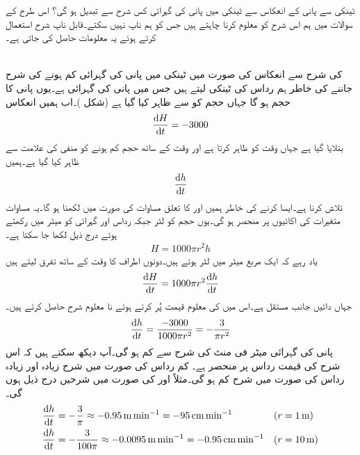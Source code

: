 ٹینکی سے  پانی کے انعکاس سے ٹینکی میں پانی کی گہرائی کس شرح سے تبدیل ہو گی؟ اس طرح کے سوالات میں ہم اس  شرح کو معلوم کرنا چاہتے  ہیں جس کو ہم ناپ نہیں سکتے۔قابل ناپ شرح استعمال کرتے ہوئے یہ معلومات حاصل کی جاتی ہے۔

\\
 کی شرح سے انعکاس کی صورت میں ٹینکی میں پانی کی گہرائی کم ہونے کی شرح جاننے کی خاطر ہم رداس  کی ٹینکی لیتے ہیں جس میں پانی کی گہرائی  ہے۔یوں پانی کا حجم  ہو گا جہاں حجم کو  سے ظاہر کیا گیا ہے (شکل )۔اب ہمیں انعکاس
\begin{align*}
\frac{\dif H}{\dif t}=-3000
\end{align*}
بتلایا گیا ہے جہاں  وقت کو ظاہر کرتا ہے اور وقت کے ساتھ حجم کم ہونے کو منفی کی علامت سے ظاہر کیا گیا ہے۔ہمیں
\begin{align*}
\frac{\dif h}{\dif t}
\end{align*}
تلاش کرنا ہے۔ایسا کرنے کی خاطر ہمیں  اور  کا تعلق مساوات کی صورت میں لکھنا ہو گا۔یہ مساوات متغیرات کی اکائیوں پر منحصر ہو گی۔یوں حجم کو لٹر جبکہ رداس اور گہرائی کو میٹر میں رکھتے ہوئے درج ذیل لکھا جا سکتا ہے۔
\begin{align*}
H=1000\pi r^2h
\end{align*}
یاد رہے کہ ایک  مربع میٹر میں  لٹر ہوتے ہیں۔دونوں اطراف کا وقت کے ساتھ تفرق لیتے ہیں
\begin{align*}
\frac{\dif H}{\dif t}=1000\pi r^2\frac{\dif h}{\dif t}
\end{align*}
جہاں دائیں جانب  مستقل ہے۔اس میں  کی معلوم قیمت پُر کرتے ہوئے نا معلوم شرح  حاصل کرتے ہیں۔
\begin{align*}
\frac{\dif h}{\dif t}=\frac{-3000}{1000\pi r^2}=-\frac{3}{\pi r^2}
\end{align*}
پانی کی گہرائی  میٹر فی منٹ کی شرح سے کم ہو گی۔آپ دیکھ سکتے ہیں کہ  اس  شرح  کی قیمت رداس پر منحصر ہے۔ کم رداس کی صورت میں شرح زیادہ اور زیادہ رداس کی صورت میں شرح کم ہو گی۔مثلاً  اور  کی صورت میں شرحیں  درج ذیل ہوں گی۔
\begin{align*}
\frac{\dif h}{\dif t}&=-\frac{3}{\pi}\approx \SI{-0.95}{\meter\per\minute}=\SI{-95}{\centi\meter\per\minute}&&(r=\SI{1}{\meter})\\
\frac{\dif h}{\dif t}&=-\frac{3}{100\pi}\approx \SI{-0.0095}{\meter\per\minute}=\SI{-0.95}{\centi\meter\per\minute}&&(r=\SI{10}{\meter})
\end{align*}
